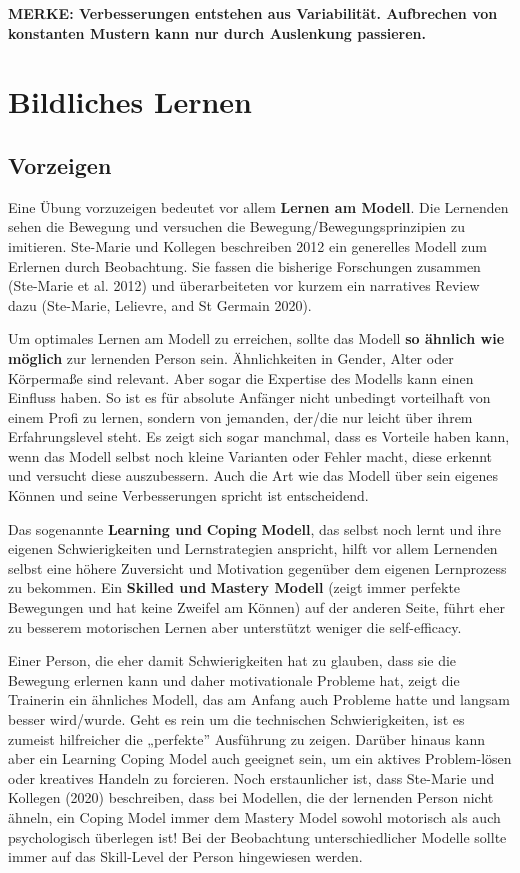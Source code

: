 \documentclass[
  letterpaper,
  DIV=11,
  numbers=noendperiod]{scrreprt}
\begin{document}
\textbf{MERKE: Verbesserungen entstehen aus Variabilität. Aufbrechen von
konstanten Mustern kann nur durch Auslenkung passieren.}

\section{Bildliches Lernen}\label{bildliches-lernen}

\subsection{Vorzeigen}\label{vorzeigen}

Eine Übung vorzuzeigen bedeutet vor allem \textbf{Lernen am Modell}. Die
Lernenden sehen die Bewegung und versuchen die
Bewegung/Bewegungsprinzipien zu imitieren. Ste-Marie und Kollegen
beschreiben 2012 ein generelles Modell zum Erlernen durch Beobachtung.
Sie fassen die bisherige Forschungen zusammen (Ste-Marie et al. 2012)
und überarbeiteten vor kurzem ein narratives Review dazu (Ste-Marie,
Lelievre, and St Germain 2020).

Um optimales Lernen am Modell zu erreichen, sollte das Modell \textbf{so
ähnlich wie möglich} zur lernenden Person sein. Ähnlichkeiten in Gender,
Alter oder Körpermaße sind relevant. Aber sogar die Expertise des
Modells kann einen Einfluss haben. So ist es für absolute Anfänger nicht
unbedingt vorteilhaft von einem Profi zu lernen, sondern von jemanden,
der/die nur leicht über ihrem Erfahrungslevel steht. Es zeigt sich sogar
manchmal, dass es Vorteile haben kann, wenn das Modell selbst noch
kleine Varianten oder Fehler macht, diese erkennt und versucht diese
auszubessern. Auch die Art wie das Modell über sein eigenes Können und
seine Verbesserungen spricht ist entscheidend.

Das sogenannte \textbf{Learning und} \textbf{Coping} \textbf{Modell},
das selbst noch lernt und ihre eigenen Schwierigkeiten und
Lernstrategien anspricht, hilft vor allem Lernenden selbst eine höhere
Zuversicht und Motivation gegenüber dem eigenen Lernprozess zu bekommen.
Ein \textbf{Skilled und} \textbf{Mastery Modell} (zeigt immer perfekte
Bewegungen und hat keine Zweifel am Können) auf der anderen Seite, führt
eher zu besserem motorischen Lernen aber unterstützt weniger die
self-efficacy.

Einer Person, die eher damit Schwierigkeiten hat zu glauben, dass sie
die Bewegung erlernen kann und daher motivationale Probleme hat, zeigt
die Trainerin ein ähnliches Modell, das am Anfang auch Probleme hatte
und langsam besser wird/wurde. Geht es rein um die technischen
Schwierigkeiten, ist es zumeist hilfreicher die „perfekte'' Ausführung
zu zeigen. Darüber hinaus kann aber ein Learning Coping Model auch
geeignet sein, um ein aktives Problem-lösen oder kreatives Handeln zu
forcieren. Noch erstaunlicher ist, dass Ste-Marie und Kollegen (2020)
beschreiben, dass bei Modellen, die der lernenden Person nicht ähneln,
ein Coping Model immer dem Mastery Model sowohl motorisch als auch
psychologisch überlegen ist! Bei der Beobachtung unterschiedlicher
Modelle sollte immer auf das Skill-Level der Person hingewiesen werden.
\end{document}
